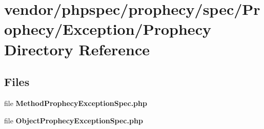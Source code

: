 \section{vendor/phpspec/prophecy/spec/\+Prophecy/\+Exception/\+Prophecy Directory Reference}
\label{dir_9bee8ed28e99ef73debf4549e47485cf}
\subsection*{Files}
\begin{DoxyCompactItemize}
\item 
file {\bf Method\+Prophecy\+Exception\+Spec.\+php}
\item 
file {\bf Object\+Prophecy\+Exception\+Spec.\+php}
\end{DoxyCompactItemize}
